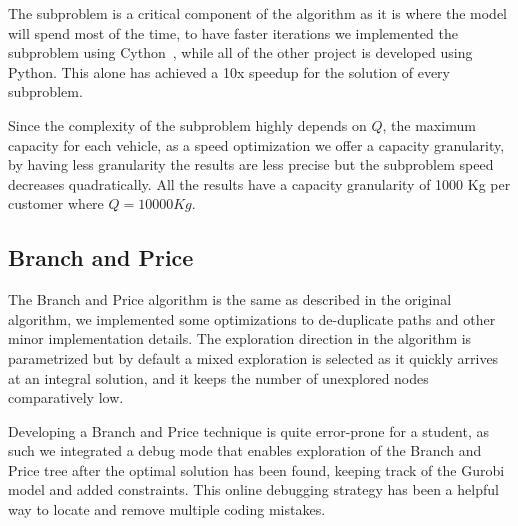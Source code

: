 The subproblem is a critical component of the algorithm as it is where the model will spend most of the time, to have faster iterations we implemented the subproblem using Cython~\cite{behnel2011cython}, while all of the other project is developed using Python. This alone has achieved a 10x speedup for the solution of every subproblem.

Since the complexity of the subproblem highly depends on $Q$, the maximum capacity for each vehicle, as a speed optimization we offer a capacity granularity, by having less granularity the results are less precise but the subproblem speed decreases quadratically. All the results have a capacity granularity of 1000 Kg per customer where $Q = 10000Kg$.

\subsection{Branch and Price}
The Branch and Price algorithm is the same as described in the original algorithm, we implemented some optimizations to de-duplicate paths and other minor implementation details. The exploration direction in the algorithm is parametrized but by default a mixed exploration is selected as it quickly arrives at an integral solution, and it keeps the number of unexplored nodes comparatively low.

Developing a Branch and Price technique is quite error-prone for a student, as such we integrated a debug mode that enables exploration of the Branch and Price tree after the optimal solution has been found, keeping track of the Gurobi model and added constraints. This online debugging strategy has been a helpful way to locate and remove multiple coding mistakes.
